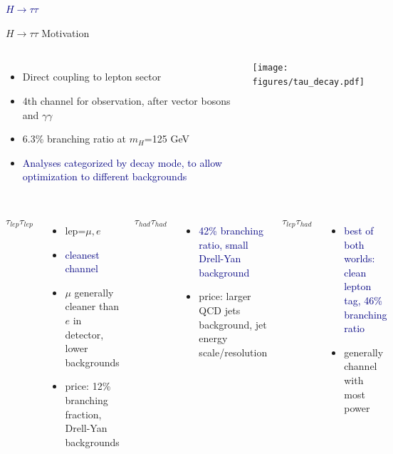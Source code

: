 \documentclass{beamer}
\begin{document}
\begin{frame}[c]
	\frametitle{\ }
	\begin{center}
	\huge \textcolor{Navy}{$H\rightarrow\tau\tau$}
	\end{center}
\end{frame}



\begin{frame}{$H\rightarrow \tau \tau$ Motivation}
	\begin{columns}[c]
	\begin{itemize} \scriptsize

		\item \textcolor{BrickRed}{Direct coupling to lepton sector}
		\item 4th channel for observation, after vector bosons and $\gamma \gamma$
		\item \textcolor{BrickRed}{6.3\% branching ratio at $m_H$=125 GeV}
		\item \textcolor{Navy}{Analyses categorized by decay mode, to allow optimization to different backgrounds}

	\end{itemize}
		\texttt{[image: figures/tau\_decay.pdf]}
	\end{columns}
	
	\vspace{1cm}

	\begin{columns}
			$\tau_{lep}\tau_{lep}$
			\begin{itemize} \scriptsize
				\item lep=$\mu, e$
				\item \textcolor{Navy}{cleanest channel}
				\item $\mu$ generally cleaner than $e$ in detector, lower backgrounds
				\item \textcolor{BrickRed}{price: 12\% branching fraction, Drell-Yan backgrounds}
			\end{itemize}

			$\tau_{had}\tau_{had}$
			\begin{itemize} \scriptsize
				\item \textcolor{Navy}{42\% branching ratio, small Drell-Yan background}
				\item \textcolor{BrickRed}{price: larger QCD jets background, jet energy scale/resolution}
			\end{itemize}


			$\tau_{lep}\tau_{had}$

				\begin{itemize}	\scriptsize		
					\item \textcolor{Navy}{best of both worlds: clean lepton tag, 46\% branching ratio}
					\item \textcolor{BrickRed}{generally channel with most power}
				\end{itemize}
	\end{columns}
\end{frame}
\end{document}

